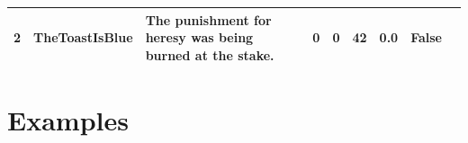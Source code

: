 \documentclass[a4paper]{article}
\begin{document}
\begin{table}
\begin{tabularx}{\textwidth}{@{}llLllllll@{}}
        2  & TheToastIsBlue & The punishment for heresy was being burned at the stake.                                                                                                                                                                                                                                                                                                                                                                                                                                                                                                                                                                                                                                                                                                                                                                                                                                                                                                                                                                                                                                                                                                                                                                                                                                                                                                                                                                                                                                                                                                                                    & 0        & 0     & 42  & 0.0            & False       \\ \hline
        
    \end{tabularx}
\end{table}

\section{Examples}
\end{document}
